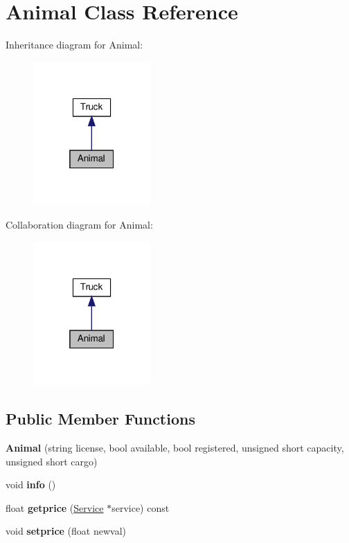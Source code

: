 \hypertarget{class_animal}{}\section{Animal Class Reference}
\label{class_animal}


Inheritance diagram for Animal\+:\nopagebreak
\begin{figure}[H]
\begin{center}
\leavevmode
\includegraphics[width=127pt]{class_animal__inherit__graph}
\end{center}
\end{figure}


Collaboration diagram for Animal\+:\nopagebreak
\begin{figure}[H]
\begin{center}
\leavevmode
\includegraphics[width=127pt]{class_animal__coll__graph}
\end{center}
\end{figure}
\subsection*{Public Member Functions}
\begin{DoxyCompactItemize}
\item 
\mbox{\label{class_animal_afdae9b8c4716472196e8cd62c762f88a}} 
{\bfseries Animal} (string license, bool available, bool registered, unsigned short capacity, unsigned short cargo)
\item 
\mbox{\label{class_animal_a1e99083943239209f4fbe79380ea5991}} 
void {\bfseries info} ()
\item 
\mbox{\label{class_animal_ae7d29605e1609b12836af44929b309e5}} 
float {\bfseries getprice} (\hyperlink{class_service}{Service} $\ast$service) const
\item 
\mbox{\label{class_animal_ac82fce4c39f299a7342e6b0b2b380a6c}} 
void {\bfseries setprice} (float newval)
\end{DoxyCompactItemize}
